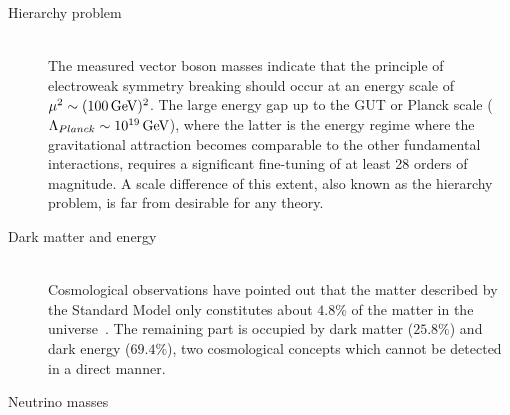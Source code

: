 \begin{myindentpar}
\begin{description}
    \item[Hierarchy problem] \hfill \\
    The measured vector boson masses indicate that the principle of electroweak symmetry breaking should occur at an energy scale of $\mu^{2} \sim (100 \, \mathrm{GeV})^{2}$.
    The large energy gap up to the GUT or Planck scale ($\Lambda_{Planck} \sim 10^{19} \, \mathrm{GeV}$), where the latter is the energy regime where the gravitational attraction becomes comparable to the other fundamental interactions, requires a significant fine-tuning of at least 28 orders of magnitude. 
    A scale difference of this extent, also known as the hierarchy problem, is far from desirable for any theory.
    
    \item[Dark matter and energy] \hfill \\
    Cosmological observations have pointed out that the matter described by the Standard Model only constitutes about $4.8 \%$ of the matter in the universe~\cite{PlanckResults}. The remaining part is occupied by dark matter ($25.8 \%$) and dark energy ($69.4 \%$), two cosmological concepts which cannot be detected in a direct manner.
    
    
    \item[Neutrino masses] \hfill \\
    
   \end{description}
\end{myindentpar}
